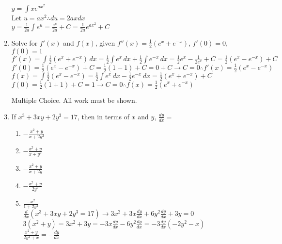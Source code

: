 \documentclass[10pt, letterpaper]{report}
\begin{document}
\begin{enumerate}
    $y=\int{xe^{ax^{2}}}$ \\

    Let $u=ax^{2}\therefore du=2axdx$ \\

    $y=\frac{1}{2a}\int{e^{u}}=\frac{e^{u}}{2a}+C=\frac{1}{2a}e^{ax^{2}}+C$ \\

  \item{Solve for $f'(x)$ and $f(x)$, given $f''(x)=\frac{1}{2}(e^{x}+e^{-x})$, $f'(0)=0$, $f(0)=1$} \\

    $f'(x)=\int{\frac{1}{2}(e^{x}+e^{-x})}\,dx=\frac{1}{2}\int{e^{x}}\,dx+\frac{1}{2}\int{e^{-x}}\,dx=
    \frac{1}{2}e^{x}-\frac{1}{2e^{x}}+C=\frac{1}{2}(e^{x}-e^{-x})+C$ \\

    $f'(0)=\frac{1}{2}(e^{x}-e^{-x})+C=\frac{1}{2}(1-1)+C=0+C\rightarrow C=0\therefore f'(x)=\frac{1}{2}(e^{x}-e^{-x})$ \\

    $f(x)=\int{\frac{1}{2}(e^{x}-e^{-x})}=\frac{1}{2}\int{e^{x}}\,dx-\frac{1}{2}{e^{-x}}\,dx=
    \frac{1}{2}(e^{x}+e^{-x})+C$ \\

    $f(0)=\frac{1}{2}(1+1)+C=1\rightarrow C=0\therefore f(x)=\frac{1}{2}(e^{x}+e^{-x})$
\pagebreak
  \par \noindent Multiple Choice. All work must be shown.
  \item{If $x^{3}+3xy+2y^{3}=17$, then in terms of $x$ and $y$, $\frac{dy}{dx}=$} \\
    \begin{enumerate}
      \item{$-\frac{x^{2}+y}{x+2y^{2}}$}
      \item{$-\frac{x^{2}+y}{x+y^{2}}$}
      \item{$-\frac{x^{2}+y}{x+2y}$}
      \item{$-\frac{x^{2}+y}{2y^{2}}$}
      \item{$\frac{-x^{2}}{1+2y^{2}}$} \\

      $\frac{d}{dx}\left( x^{3}+3xy+2y^{3}=17 \right)\rightarrow 3x^{2}+3x\frac{dy}{dx}+6y^{2}\frac{dy}{dx}+3y=0$ \\

      $3(x^{2}+y)=3x^{2}+3y=-3x\frac{dy}{dx}-6y^{2}\frac{dy}{dx}=-3\frac{dy}{dx}(-2y^{2}-x)$ \\

      $\frac{x^{2}+y}{2y^{2}+x}=-\frac{dy}{dx}$ \\


\end{enumerate}
\end{enumerate}
\end{document}
